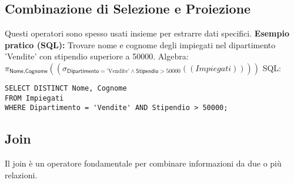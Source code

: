 \documentclass{article}
\newcommand{\Rel}[1]{\textit{#1}} %
\newcommand{\Attr}[1]{\textsf{#1}} %
\newcommand{\myselectop}[2]{\sigma_{#1}(#2)}
\newcommand{\myproject}[2]{\pi_{#1}(#2)}
\newcommand{\mylandop}{\wedge}
\begin{document}
	\subsection{Combinazione di Selezione e Proiezione}
	Questi operatori sono spesso usati insieme per estrarre dati specifici.
	\textbf{Esempio pratico (SQL):} Trovare nome e cognome degli impiegati nel dipartimento 'Vendite' con stipendio superiore a 50000.
	Algebra: $\myproject{\Attr{Nome}, \Attr{Cognome}}{(\myselectop{\Attr{Dipartimento} = \text{'Vendite'} \mylandop \Attr{Stipendio} > 50000}{(\Rel{Impiegati})})}$
	SQL:
	\begin{verbatim}
SELECT DISTINCT Nome, Cognome
FROM Impiegati
WHERE Dipartimento = 'Vendite' AND Stipendio > 50000;
	\end{verbatim}
	
	\subsection{Join}
	Il join è un operatore fondamentale per combinare informazioni da due o più relazioni.
\end{document}
